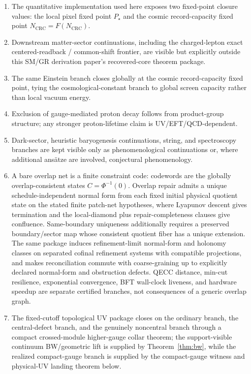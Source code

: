 \documentclass[11pt]{article}
\begin{document}
\begin{enumerate}[leftmargin=2em]
\item The quantitative implementation used here exposes two fixed-point closure values: the local pixel fixed point \(P_\star\) and the cosmic record-capacity fixed point \(N_{\mathrm{CRC}}=F(N_{\mathrm{CRC}})\).
\item Downstream matter-sector continuations, including the charged-lepton exact centered-readback / common-shift frontier, are visible but explicitly outside this SM/GR derivation paper's recovered-core theorem package.
\item The same Einstein branch closes globally at the cosmic record-capacity fixed point, tying the cosmological-constant branch to global screen capacity rather than local vacuum energy.
\item Exclusion of gauge-mediated proton decay follows from product-group structure; any stronger proton-lifetime claim is UV/EFT/QCD-dependent.
\item Dark-sector, heuristic baryogenesis continuations, string, and spectroscopy branches are kept visible only as phenomenological continuations or, where additional ans\"atze are involved, conjectural phenomenology.
\item A bare overlap net is a finite constraint code: codewords are the globally overlap-consistent states \(C=\Phi^{-1}(0)\). Overlap repair admits a unique schedule-independent normal form from each fixed initial physical quotient state on the stated finite patch-net hypotheses, where Lyapunov descent gives termination and the local-diamond plus repair-completeness clauses give confluence. Same-boundary uniqueness additionally requires a preserved boundary/sector map whose consistent quotient fiber has a unique extension. The same package induces refinement-limit normal-form and holonomy classes on separated cofinal refinement systems with compatible projections, and makes reconciliation commute with coarse-graining up to explicitly declared normal-form and obstruction defects. QECC distance, min-cut resilience, exponential convergence, BFT wall-clock liveness, and hardware speedup are separate certified branches, not consequences of a generic overlap graph.
\item The fixed-cutoff topological UV package closes on the ordinary branch, the central-defect branch, and the genuinely noncentral branch through a compact crossed-module higher-gauge collar theorem; the support-visible continuum BW/geometric lift is supplied by Theorem~\ref{thm:bw}, while the realized compact-gauge branch is supplied by the compact-gauge witness and physical-UV landing theorem below.
\end{enumerate}
\end{document}
